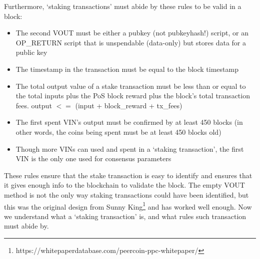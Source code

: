 Furthermore, ‘staking transactions’ must abide by these rules to be valid
in a block:
\begin{itemize}
	\item The second VOUT must be either a pubkey (not pubkeyhash!) script, 
	or an OP\_RETURN script that is unspendable (data-only) but stores data 
	for a public key
	\item The timestamp in the transaction must be equal to the block timestamp
	\item The total output value of a stake transaction must be less than or 
	equal to the total inputs plus the PoS block reward plus the block's 
	total transaction fees. output $<=$ (input + block\_reward + tx\_fees)
	\item The first spent VIN's output must be confirmed by at least 450 
	blocks (in other words, the coins being spent must be at least 450 
	blocks old)
	\item Though more VINs can used and spent in a ‘staking transaction’, 
	the first VIN is the only one used for consensus parameters
\end{itemize}



These rules ensure that the stake transaction is easy to identify and
ensures that it gives enough info to the blockchain to validate the block.
The empty VOUT method is not the only way staking transactions could have
been identified, but this was the original design from Sunny
King\footnote{https://whitepaperdatabase.com/peercoin-ppc-whitepaper/}
and has worked well enough. Now we understand what a ‘staking transaction’
is, and what rules such transaction must abide by.



